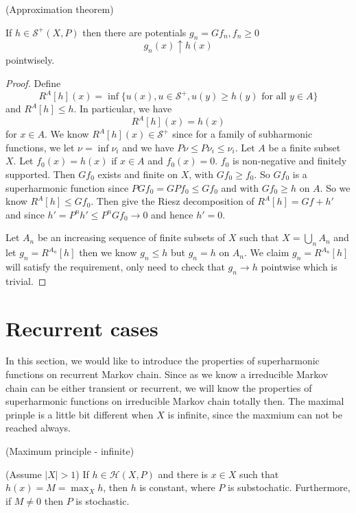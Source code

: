 \documentclass[lang=en,11pt,a4paper,citestyle =authoryear]{elegantpaper}
\newcommand{\Har}{\mathcal{H}}
\newcommand{\Sar}{\mathcal{S}}
\begin{document}
\begin{theorem}
    (Approximation theorem)\par If $h \in \Sar^+(X,P)$ then there are potentials $g_n = Gf_n, f_n \geq 0$
    \[
    g_n(x) \uparrow  h(x)
    \]
    pointwisely.
\end{theorem}
\begin{proof}
    Define
    \[
    R^A[h](x) = \inf\{u(x), u\in\Sar^+, u(y) \geq h(y)\text{ for all }y\in A\}
    \]
    and $R^A[h] \leq h$. In particular, we have
    \[
    R^A[h](x) = h(x) 
    \]
    for $x\in A$. We know $R^A[h](x) \in \Sar^+$ since for a family of subharmonic functions, we let $\nu = \inf\nu_i$ and we have $P\nu \leq P\nu_i \leq \nu_i$. Let $A$ be a finite subset $X$. Let $f_0 (x) = h(x)$ if $x\in A$ and $f_0(x) = 0$. $f_0$ is non-negative and finitely supported. Then $Gf_0$ exists and finite on $X$, with $Gf_0 \geq f_0$. So $Gf_0$ is a superharmonic function since $P Gf_0 = GPf_0 \leq Gf_0$ and with $Gf_0 \geq h$ on  $A$. So we know $R^A[h]\leq Gf_0$. Then give the Riesz decomposition of $R^A[h] = Gf + h'$ and since $h' = P^{n}h' \leq P^{n}Gf_0 \to 0$ and hence $h' = 0$.\par
    Let $A_n$ be an increasing sequence of finite subsets of $X$ such that $X = \bigcup_{n}A_n$ and let $g_n = R^{A_n}[h]$ then we know $g_n \leq h$ but $g_n = h$ on $A_n$. We claim $g_n = R^{A_n}[h]$ will satisfy the requirement, only need to check that $g_n \to h$ pointwise which is trivial.
\end{proof}

\section{Recurrent cases}

In this section, we would like to introduce the properties of superharmonic functions on recurrent Markov chain. Since as we know a irreducible Markov chain can be either transient or recurrent, we will know the properties of superharmonic functions on irreducible Markov chain totally then. The maximal prinple is a little bit different when $X$ is infinite, since the maxmium can not be reached always.

\begin{theorem}
    (Maximum principle - infinite) \par(Assume $|X| > 1$) If $h\in\Har(X,P)$ and there is $x\in X$ such that $h(x) = M = \max_X h$, then $h$ is constant, where $P$ is substochatic. Furthermore, if $M\neq 0$ then $P$ is stochastic.
\end{theorem}
\end{document}
